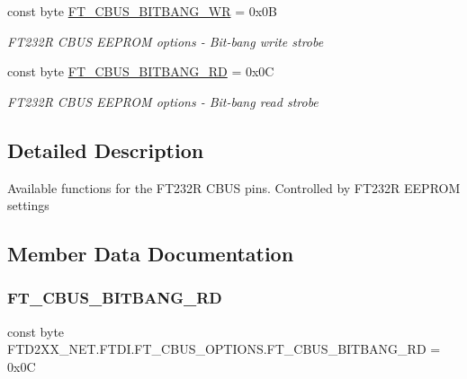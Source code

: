 \begin{DoxyCompactItemize}
const byte \mbox{\hyperlink{class_f_t_d2_x_x___n_e_t_1_1_f_t_d_i_1_1_f_t___c_b_u_s___o_p_t_i_o_n_s_af4bc60736821c8439aca6a8a4cac4a27}{F\+T\+\_\+\+C\+B\+U\+S\+\_\+\+B\+I\+T\+B\+A\+N\+G\+\_\+\+WR}} = 0x0B
\begin{DoxyCompactList}\small\item\em F\+T232R C\+B\+US E\+E\+P\+R\+OM options -\/ Bit-\/bang write strobe \end{DoxyCompactList}\item 
const byte \mbox{\hyperlink{class_f_t_d2_x_x___n_e_t_1_1_f_t_d_i_1_1_f_t___c_b_u_s___o_p_t_i_o_n_s_a449550594227485e314ed2a9e3d19fdf}{F\+T\+\_\+\+C\+B\+U\+S\+\_\+\+B\+I\+T\+B\+A\+N\+G\+\_\+\+RD}} = 0x0C
\begin{DoxyCompactList}\small\item\em F\+T232R C\+B\+US E\+E\+P\+R\+OM options -\/ Bit-\/bang read strobe \end{DoxyCompactList}\end{DoxyCompactItemize}


\subsection{Detailed Description}
Available functions for the F\+T232R C\+B\+US pins. Controlled by F\+T232R E\+E\+P\+R\+OM settings 



\subsection{Member Data Documentation}
\mbox{\label{class_f_t_d2_x_x___n_e_t_1_1_f_t_d_i_1_1_f_t___c_b_u_s___o_p_t_i_o_n_s_a449550594227485e314ed2a9e3d19fdf}} 
\subsubsection{\texorpdfstring{FT\_CBUS\_BITBANG\_RD}{FT\_CBUS\_BITBANG\_RD}}
{\footnotesize\ttfamily const byte F\+T\+D2\+X\+X\+\_\+\+N\+E\+T.\+F\+T\+D\+I.\+F\+T\+\_\+\+C\+B\+U\+S\+\_\+\+O\+P\+T\+I\+O\+N\+S.\+F\+T\+\_\+\+C\+B\+U\+S\+\_\+\+B\+I\+T\+B\+A\+N\+G\+\_\+\+RD = 0x0C}



